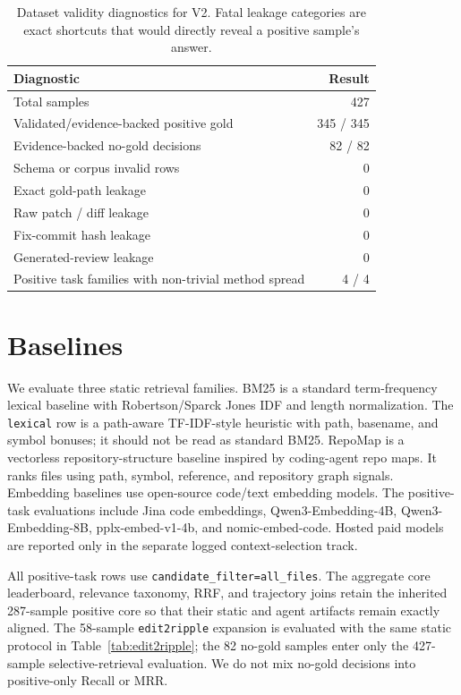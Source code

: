 \documentclass[11pt]{article}
\newcommand{\code}[1]{\texttt{#1}}
\begin{document}
\begin{table}[t]
\centering
\caption{Dataset validity diagnostics for V2. Fatal leakage categories are exact shortcuts that would directly reveal a positive sample's answer.}
\label{tab:validity-diagnostics}
\begin{tabular}{lr}
\toprule
Diagnostic & Result \\
\midrule
Total samples & 427 \\
Validated/evidence-backed positive gold & 345 / 345 \\
Evidence-backed no-gold decisions & 82 / 82 \\
Schema or corpus invalid rows & 0 \\
Exact gold-path leakage & 0 \\
Raw patch / diff leakage & 0 \\
Fix-commit hash leakage & 0 \\
Generated-review leakage & 0 \\
Positive task families with non-trivial method spread & 4 / 4 \\
\bottomrule
\end{tabular}
\end{table}

\section{Baselines}

We evaluate three static retrieval families. BM25 is a standard term-frequency lexical baseline with Robertson/Sparck Jones IDF and length normalization. The \code{lexical} row is a path-aware TF-IDF-style heuristic with path, basename, and symbol bonuses; it should not be read as standard BM25. RepoMap is a vectorless repository-structure baseline inspired by coding-agent repo maps. It ranks files using path, symbol, reference, and repository graph signals. Embedding baselines use open-source code/text embedding models. The positive-task evaluations include Jina code embeddings, Qwen3-Embedding-4B, Qwen3-Embedding-8B, pplx-embed-v1-4b, and nomic-embed-code. Hosted paid models are reported only in the separate logged context-selection track.

All positive-task rows use \code{candidate\_filter=all\_files}. The aggregate core leaderboard, relevance taxonomy, RRF, and trajectory joins retain the inherited 287-sample positive core so that their static and agent artifacts remain exactly aligned. The 58-sample \code{edit2ripple} expansion is evaluated with the same static protocol in Table~\ref{tab:edit2ripple}; the 82 no-gold samples enter only the 427-sample selective-retrieval evaluation. We do not mix no-gold decisions into positive-only Recall or MRR.
\end{document}
